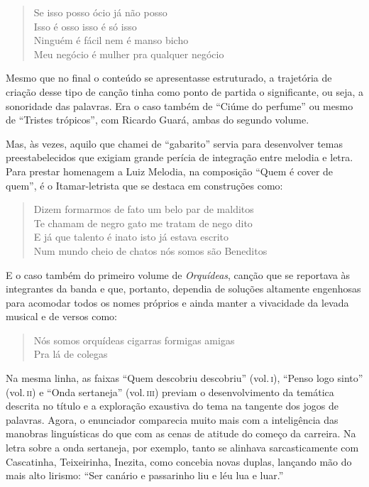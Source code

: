 \begin{verse}
\small{Se isso posso ócio já não posso\\
Isso é osso isso é só isso\\
Ninguém é fácil nem é manso bicho\\
Meu negócio é mulher pra qualquer negócio}
\end{verse}

Mesmo que no final o conteúdo se apresentasse estruturado, a trajetória
de criação desse tipo de canção tinha como ponto de partida o
significante, ou seja, a sonoridade das palavras. Era o caso também de
``Ciúme do perfume'' ou mesmo de ``Tristes trópicos'', com Ricardo Guará, ambas
do segundo volume.

Mas, às vezes, aquilo que chamei de ``gabarito'' servia para desenvolver
temas preestabelecidos que exigiam grande perícia de integração entre
melodia e letra. Para prestar homenagem a Luiz Melodia, na composição
``Quem é cover de quem'', é o Itamar-letrista que se destaca em construções
como:

\begin{verse}
\small{Dizem formarmos de fato um belo par de malditos\\
Te chamam de negro gato me tratam de nego dito\\
E já que talento é inato isto já estava escrito\\
Num mundo cheio de chatos nós somos são Beneditos}
\end{verse}

E o caso também do primeiro volume de \textit{Orquídeas}, canção que se reportava às
integrantes da banda e que, portanto, dependia de soluções altamente
engenhosas para acomodar todos os nomes próprios e ainda manter a
vivacidade da levada musical e de versos como:

\begin{verse}
\small{Nós somos orquídeas cigarras formigas amigas\\
Pra lá de colegas}
\end{verse}

Na mesma linha, as faixas ``Quem descobriu descobriu'' (vol.\,\textsc{i}), ``Penso logo
sinto'' (vol.\,\textsc{ii}) e ``Onda sertaneja'' (vol.\,\textsc{iii}) previam o desenvolvimento da
temática descrita no título e a exploração exaustiva do tema na tangente
dos jogos de palavras. Agora, o enunciador comparecia muito mais com a
inteligência das manobras linguísticas do que com as cenas de atitude do
começo da carreira. Na letra sobre a onda sertaneja, por exemplo, tanto
se alinhava sarcasticamente com Cascatinha, Teixeirinha, Inezita, como
concebia novas duplas, lançando mão do mais alto lirismo: ``Ser canário
e passarinho liu e léu lua e luar.''

